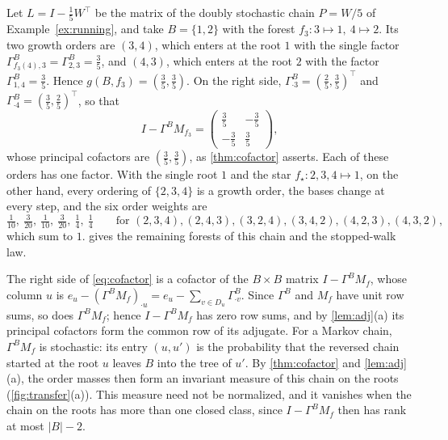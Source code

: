 \documentclass[onefignum,onetabnum,nohypdvips]{siamart250211}
\numberwithin{theorem}{section}
\numberwithin{equation}{section}
\begin{document}
\begin{example}\label{ex:calc}
Let $L=I-\tfrac15W^{\top}$ be the matrix of the doubly stochastic
chain $P=W/5$ of Example~\ref{ex:running}, and take $B=\{1,2\}$ with the forest
$f_3:3\mapsto1,\ 4\mapsto2$. Its two growth orders are $(3,4)$, which
enters at the root $1$ with the single factor
$\Gamma^B_{f_3(4),3}=\Gamma^B_{2,3}=\tfrac35$, and $(4,3)$,
which enters at the root $2$ with the factor
$\Gamma^B_{1,4}=\tfrac35$. Hence $g(B,f_3)=(\tfrac35,\tfrac35)$. On
the right side, $\Gamma^B_{\cdot3}=(\tfrac25,\tfrac35)^{\top}$ and
$\Gamma^B_{\cdot4}=(\tfrac35,\tfrac25)^{\top}$, so that
\[
I-\Gamma^BM_{f_3}=\begin{pmatrix}\tfrac35&-\tfrac35\\[2pt]-\tfrac35&\tfrac35\end{pmatrix},
\]
whose principal cofactors are $(\tfrac35,\tfrac35)$, as
\cref{thm:cofactor} asserts. Each of these orders has one factor. With
the single root $1$ and the star $f_\star:2,3,4\mapsto1$, on the other
hand, every ordering of $\{2,3,4\}$ is a growth order, the bases change
at every step, and the six order weights are
\[
\tfrac1{10},\ \tfrac3{20},\ \tfrac1{10},\ \tfrac3{20},\ \tfrac14,\ \tfrac14
\qquad\text{for }(2,3,4),(2,4,3),(3,2,4),(3,4,2),(4,2,3),(4,3,2),
\]
which sum to $1$.  gives the remaining forests of
this chain and the stopped-walk law.
\end{example}
\begin{remark}\label{rem:reading}
The right side of \eqref{eq:cofactor} is a cofactor of the
$B\times B$ matrix $I-\Gamma^BM_f$, whose column $u$ is
$e_u-(\Gamma^BM_f)_{\cdot u}=e_u-\sum_{v\in D_u}\Gamma^B_{\cdot v}$.
Since $\Gamma^B$ and $M_f$ have unit row sums, so does $\Gamma^BM_f$;
hence $I-\Gamma^BM_f$ has zero row sums, and by \cref{lem:adj}(a) its
principal cofactors form the common row of its adjugate. For a Markov
chain, $\Gamma^BM_f$ is stochastic: its entry $(u,u')$ is the
probability that the reversed chain started at the root $u$ leaves $B$
into the tree of $u'$. By \cref{thm:cofactor} and \cref{lem:adj}(a),
the order masses then form an invariant measure of this chain on the
roots (\cref{fig:transfer}(a)). This measure need not be normalized, and
it vanishes when the chain on the roots has more than one closed class,
since $I-\Gamma^BM_f$ then has rank at most $|B|-2$.
\end{remark}
\end{document}
